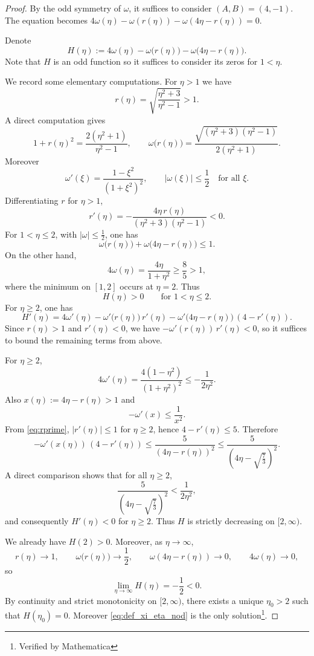 \documentclass[reqno,english,11pt]{amsart}
\theoremstyle{definition}
\numberwithin{equation}{section}
\begin{document}
\begin{proof}
    By the odd symmetry of $\omega$, it suffices to consider $(A,B) = (4,-1)$. The equation becomes $4\omega(\eta) - \omega(r(\eta)) - \omega(4\eta - r(\eta)) = 0$.

Denote 
\begin{equation}
    H(\eta):=4\omega(\eta)-\omega\big(r(\eta)\big)
-\omega\big(4\eta-r(\eta)\big).
\end{equation}Note that $H$ is an odd function so it suffices to consider its zeros for  $1<\eta$.

We record some elementary computations. For $\eta>1$ we have
$$
r(\eta)=\sqrt{\frac{\eta^2+3}{\eta^2-1}}>1.
$$
A direct computation gives
$$
1+r(\eta)^2=\frac{2(\eta^2+1)}{\eta^2-1},
\qquad
\omega\big(r(\eta)\big)
=\frac{\sqrt{(\eta^2+3)(\eta^2-1)}}{2(\eta^2+1)}.
$$
Moreover
$$
\omega'(\xi)=\frac{1-\xi^2}{(1+\xi^2)^2},
\qquad
|\omega(\xi)|\le \frac12 \quad\text{for all }\xi.
$$
Differentiating $r$ for $\eta>1$,
\begin{equation}\label{eq:rprime}
r'(\eta)=-\frac{4\eta\,r(\eta)}{(\eta^2+3)(\eta^2-1)}<0.
\end{equation}
For $1<\eta\le2$, with $|\omega|\le\frac12$, one has
$$
\omega\big(r(\eta)\big)+\omega\big(4\eta-r(\eta)\big)\le1.
$$
On the other hand,
$$
4\omega(\eta)=\frac{4\eta}{1+\eta^2}
\ge \frac{8}{5}>1,
$$
where the minimum on $[1,2]$ occurs at $\eta=2$. Thus
$$
H(\eta)>0\qquad\text{for }1<\eta\le2.
$$
For $\eta\ge2$, one has
$$
H'(\eta)
=4\omega'(\eta)
-\omega'\big(r(\eta)\big)\,r'(\eta)
-\omega'\big(4\eta-r(\eta)\big)\,(4-r'(\eta)).
$$
Since $r(\eta)>1$ and $r'(\eta)<0$, we have $
-\omega'(r(\eta))\,r'(\eta)<0$,
so it suffices to bound the remaining terms from above.    

For $\eta\ge2$,
$$
4\omega'(\eta)
=\frac{4(1-\eta^2)}{(1+\eta^2)^2}
\le -\frac{1}{2\eta^2}.
$$
Also $x(\eta):=4\eta-r(\eta)>1$ and
$$
-\omega'(x)\le \frac{1}{x^2}.
$$
From \eqref{eq:rprime}, $|r'(\eta)|\le1$ for $\eta\ge2$, hence
$4-r'(\eta)\le5$. Therefore
$$
-\omega'(x(\eta))\,(4-r'(\eta))
\le \frac{5}{(4\eta-r(\eta))^2}
\le \frac{5}{(4\eta-\sqrt{\frac{7}{3}})^2}.
$$
A direct comparison shows that for all $\eta\ge2$,
$$
\frac{5}{(4\eta-\sqrt{\frac{7}{3}})^2}
<\frac{1}{2\eta^2},
$$
and consequently $H'(\eta)<0$ for $\eta\ge2$. Thus $H$ is strictly
decreasing on $[2,\infty)$.

We already have $H(2)>0$. Moreover, as $\eta\to\infty$,
$$
r(\eta)\to1,\qquad
\omega\big(r(\eta)\big)\to\frac12,\qquad
\omega(4\eta-r(\eta))\to0,\qquad
4\omega(\eta)\to0,
$$
so
$$
\lim_{\eta\to\infty}H(\eta)=-\frac12<0.
$$
By continuity and strict monotonicity on $[2,\infty)$, there exists a
unique $\eta_0>2$ such that $H(\eta_0)=0$.
Moreover \eqref{eq:def_xi_eta_nod} is the only solution\footnote{Verified by Mathematica}.
\end{proof}
\end{document}
